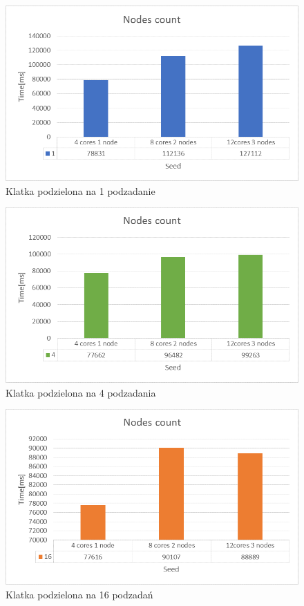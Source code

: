 \documentclass[a4paper]{article}
\begin{document}
\begin{figure}[H]
    \centering
    \includegraphics[width=\textwidth]{3-1.png}
    \caption{Klatka podzielona na 1 podzadanie}
    \label{fig:my_frac}
\end{figure}
\begin{figure}[H]
    \centering
    \includegraphics[width=\textwidth]{3-2.png}
    \caption{Klatka podzielona na 4 podzadania}
    \label{fig:my_frac}
\end{figure}
\begin{figure}[H]
    \centering
    \includegraphics[width=\textwidth]{3-3.png}
    \caption{Klatka podzielona na 16 podzadań}
    \label{fig:my_frac}
\end{figure}
\end{document}
